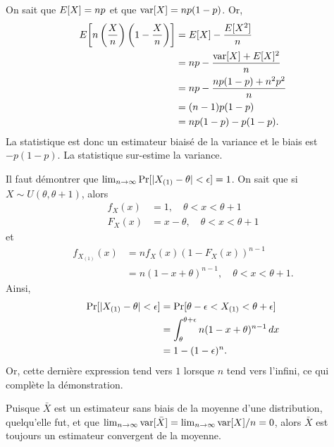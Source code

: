 \begin{solution}{3.6}
    On sait que $E [ X ] = np$ et que $\mathrm{var} [ X ] = np (1 - p)$. Or,
    \begin{align*}
      E\! \left[ n\left(\frac{X}{n}\right)\left(1-\frac{X}{n}\right) \right] &=
      E [ X ] - \frac{E [ X^2 ]}{n}\\
      &= np - \frac{\mathrm{var} [ X ] + E [ X ]^2}{n}\\
      &= np - \frac{np(1 - p) + n^2 p^2}{n}\\
      &= (n - 1) p (1 - p) \\
      &= n p (1 - p) - p(1 - p).
    \end{align*}
    La statistique est donc un estimateur biaisé de la variance et le
    biais est $-p (1 - p)$. La statistique sur-estime la variance.
  
\end{solution}
\begin{solution}{3.7}
    Il faut démontrer que $\lim_{n \rightarrow \infty}
    \mathrm{Pr} [ \lvert X_{(1)} - \theta \rvert < \epsilon ] = 1$. On sait que si $X
    \sim U(\theta, \theta + 1)$, alors
    \begin{align*}
      f_X(x) &= 1, \quad \theta < x < \theta + 1 \\
      F_X(x) &= x - \theta, \quad \theta < x < \theta + 1
    \end{align*}
    et
    \begin{align*}
      f_{X_{(1)}}(x) &= n f_X(x) (1 - F_X(x))^{n - 1} \\
      &= n (1 - x + \theta)^{n - 1}, \quad \theta < x < \theta + 1.
    \end{align*}
    Ainsi,
    \begin{align*}
      \mathrm{Pr} [ \lvert X_{(1)} - \theta \rvert < \epsilon ]
      &= \mathrm{Pr} [ \theta - \epsilon < X_{(1)} < \theta + \epsilon ] \\
      &= \int_\theta^{\theta + \epsilon} n (1 - x + \theta)^{n-1}\, dx \\
      &= 1 - (1 - \epsilon)^n.
    \end{align*}
    Or, cette dernière expression tend vers $1$ lorsque $n$ tend vers
    l'infini, ce qui complète la démonstration.
  
\end{solution}
\begin{solution}{3.8}
    Puisque $\bar{X}$ est un estimateur sans biais de la moyenne d'une
    distribution, quelqu'elle fut, et que $\lim_{n \rightarrow \infty}
    \mathrm{var} [ \bar{X} ] = \lim_{n \rightarrow \infty} \mathrm{var} [ X ]/n = 0$, alors
    $\bar{X}$ est toujours un estimateur convergent de la
    moyenne.
  
\end{solution}
